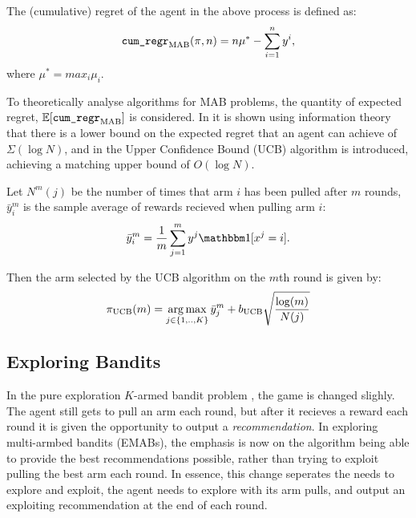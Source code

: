     \begin{defn}
        The \textnormal{(cumulative) regret} of the agent in the above process is defined as:
        \begin{align}
            {\textnormal{\texttt{cum\_regr}}}_{{\textnormal{MAB}}}(\pi,n) = n\mu^* - \sum_{i=1}^n y^i,
        \end{align}
        where $\mu^* = max_i \mu_i$.
    \end{defn}

    To theoretically analyse algorithms for MAB problems, the quantity of expected regret, $\mathbb{E}[{\textnormal{\texttt{cum\_regr}}}_{{\textnormal{MAB}}}]$ is considered. In  it is shown using information theory that there is a lower bound on the expected regret that an agent can achieve of $\Sigma(\log N)$, and in  the Upper Confidence Bound (UCB) algorithm is introduced, achieving a matching upper bound of $O(\log N)$. 

    Let $N^m(j)$ be the number of times that arm $i$ has been pulled after $m$ rounds, $\bar{y}_i^m$ is the sample average of rewards recieved when pulling arm $i$: 
    \begin{align}
        \bar{y}_i^m=\frac{1}{m}\sum_{j=1}^m y^j \one[x^j=i].
    \end{align} 
    
    Then the arm selected by the UCB algorithm on the $m$th round is given by:
    \begin{align}
        \pi_{{\textnormal{UCB}}}(m) = \operatorname*{arg\,max}_{j\in\{1,..,K\}} \bar{y}_j^m + b_{{\textnormal{UCB}}} \sqrt{\frac{\log(m)}{N(j)}} 
    \end{align}






    \subsection{Exploring Bandits}
    \label{sec:2-1-1-exploring-mab}

        In the pure exploration $K$-armed bandit problem ,
        the game is changed slighly. The agent still gets to pull an arm each round, but after it recieves a reward each round it is given the opportunity to output a \textit{recommendation}. In exploring multi-armbed bandits (EMABs), the emphasis is now on the algorithm being able to provide the best recommendations possible, rather than trying to exploit pulling the best arm each round. In essence, this change seperates the needs to explore and exploit, the agent needs to explore with its arm pulls, and output an exploiting recommendation at the end of each round.

